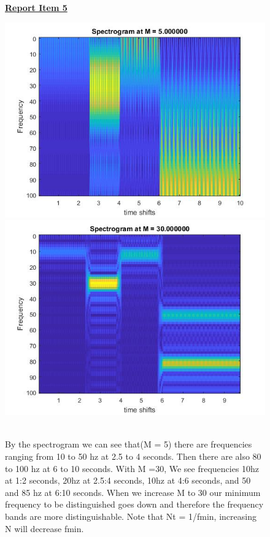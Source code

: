\documentclass{article}
\begin{document}
\begin{figure}[H]
\color{red}
\underline{\textbf{Report Item 5}}
\color{black}

\includegraphics[scale = .5]{report5}
\includegraphics[scale = .5]{report5_2}
\end{figure}
\begin{figure}[H]
\\By the spectrogram we can see that(M = 5) there are frequencies ranging from 10 to 50 hz at 2.5 to 4 seconds. Then there are also 80 to 100 hz at 6 to 10 seconds. With M =30, We see frequencies 10hz at 1:2 seconds, 20hz at 2.5:4 seconds, 10hz at 4:6 seconds, and 50 and 85 hz at 6:10 seconds. When we increase M to 30 our minimum frequency to be distinguished goes down and therefore the frequency bands are more distinguishable. Note that N\Delta t = 1/fmin, increasing N will decrease fmin. 
\end{figure}
\end{document}
